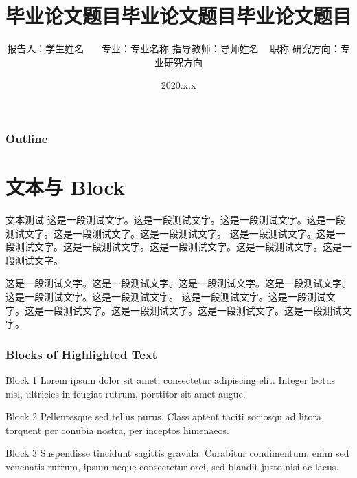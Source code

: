 \documentclass[11pt,compress]{beamer}
\title[论文题目]{毕业论文题目毕业论文题目毕业论文题目}
\author[学生姓名]
{
  报告人：学生姓名~~~ \vskip 3mm
  专业：专业名称 \vskip 3mm
  指导教师：导师姓名 ~ 职称 \vskip 3mm
  研究方向：专业研究方向
}
\institute[学校名称]{}
\date[2020.x.x]{2020.x.x}
\numberwithin{thm}{section}
\numberwithin{defn}{section}
\numberwithin{lmm}{section}
\theoremstyle{example}
\numberwithin{figure}{section}
\numberwithin{table}{section}
\numberwithin{equation}{section}
\begin{document}
\songti

{
\begin{frame}
\titlepage %
\end{frame}}

\begin{frame}
\frametitle{Outline}
\tableofcontents
\end{frame}


\section{文本与 Block}

\begin{frame}{文本测试}
这是一段测试文字。这是一段测试文字。这是一段测试文字。这是一段测试文字。这是一段测试文字。这是一段测试文字。
这是一段测试文字。这是一段测试文字。这是一段测试文字。这是一段测试文字。这是一段测试文字。这是一段测试文字。

\vspace{1ex}
这是一段测试文字。这是一段测试文字。这是一段测试文字。这是一段测试文字。这是一段测试文字。这是一段测试文字。
这是一段测试文字。这是一段测试文字。这是一段测试文字。这是一段测试文字。这是一段测试文字。这是一段测试文字。

\end{frame}


\begin{frame}
\frametitle{Blocks of Highlighted Text}
\begin{block}{Block 1}
Lorem ipsum dolor sit amet, consectetur adipiscing elit. Integer lectus nisl, ultricies in feugiat rutrum, porttitor sit amet augue.
\end{block}

\begin{exampleblock}{Block 2}
Pellentesque sed tellus purus. Class aptent taciti sociosqu ad litora torquent per conubia nostra, per inceptos himenaeos.
\end{exampleblock}

\begin{alertblock}{Block 3}
Suspendisse tincidunt sagittis gravida. Curabitur condimentum, enim sed venenatis rutrum, ipsum neque consectetur orci, sed blandit justo nisi ac lacus.
\end{alertblock}
\end{frame}
\end{document}
